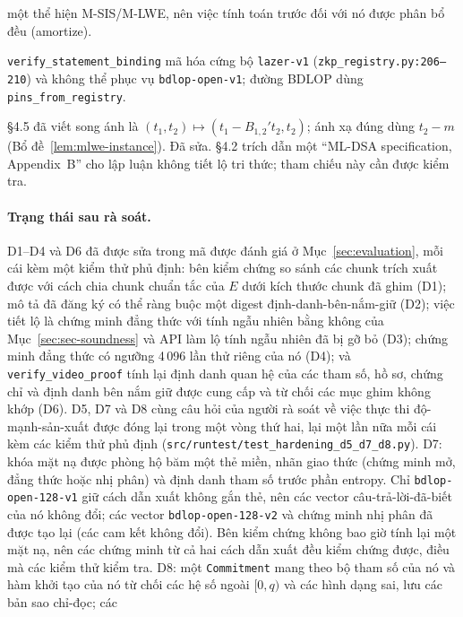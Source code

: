 \begin{description}
  một thể hiện M-SIS/M-LWE, nên việc tính toán trước đối với nó được phân bổ
  đều (amortize).
\item[D10 (thông tin):] \texttt{verify\_statement\_binding} mã hóa cứng bộ
  \texttt{lazer-v1} (\texttt{zkp\_registry.py:206--210}) và không thể phục vụ
  \texttt{bdlop-open-v1}; đường BDLOP dùng \texttt{pins\_from\_registry}.
\item[D11 (thông tin): cách diễn đạt trong đặc tả.] \S4.5 đã viết song ánh là
  $(t_1,t_2)\mapsto(t_1-B_{1,2}'t_2,t_2)$; ánh xạ đúng dùng $t_2-m$
  (Bổ đề~\ref{lem:mlwe-instance}). Đã sửa. \S4.2 trích dẫn một ``ML-DSA
  specification, Appendix~B'' cho lập luận không tiết lộ tri thức; tham chiếu
  này cần được kiểm tra.
\end{description}

\paragraph{Trạng thái sau rà soát.} D1--D4 và D6 đã được sửa trong mã được đánh
giá ở Mục~\ref{sec:evaluation}, mỗi cái kèm một kiểm thử phủ định: bên kiểm
chứng so sánh các chunk trích xuất được với cách chia chunk chuẩn tắc của $E$
dưới kích thước chunk đã ghim (D1); mô tả đã đăng ký có thể ràng buộc một digest
định-danh-bên-nắm-giữ (D2); việc tiết lộ là chứng minh đẳng thức với tính ngẫu
nhiên bằng không của Mục~\ref{sec:sec-soundness} và API làm lộ tính ngẫu nhiên
đã bị gỡ bỏ (D3); chứng minh đẳng thức có ngưỡng 4\,096 lần thử riêng của nó
(D4); và \texttt{verify\_video\_proof} tính lại định danh quan hệ của các tham
số, hồ sơ, chứng chỉ và định danh bên nắm giữ được cung cấp và từ chối các mục
ghim không khớp (D6). D5, D7 và D8 cùng câu hỏi của người rà soát về việc thực
thi độ-mạnh-sản-xuất được đóng lại trong một vòng thứ hai, lại một lần nữa mỗi
cái kèm các kiểm thử phủ định (\texttt{src/runtest/test\_hardening\_d5\_d7\_d8.py}).
D7: khóa mặt nạ được phòng hộ băm một thẻ miền, nhãn giao thức
(chứng minh mở, đẳng thức hoặc nhị phân) và định danh tham số trước phần
entropy. Chỉ \texttt{bdlop-open-128-v1} giữ cách dẫn xuất không gắn thẻ, nên
các vector câu-trả-lời-đã-biết của nó không đổi; các vector
\texttt{bdlop-open-128-v2} và chứng minh nhị phân đã được tạo lại (các cam kết
không đổi). Bên kiểm chứng không bao giờ tính lại một mặt nạ, nên các chứng minh
từ cả hai cách dẫn xuất đều kiểm chứng được, điều mà các kiểm thử kiểm tra. D8:
một \texttt{Commitment} mang theo bộ tham số của nó và hàm khởi tạo của nó từ
chối các hệ số ngoài $[0,q)$ và các hình dạng sai, lưu các bản sao chỉ-đọc; các
